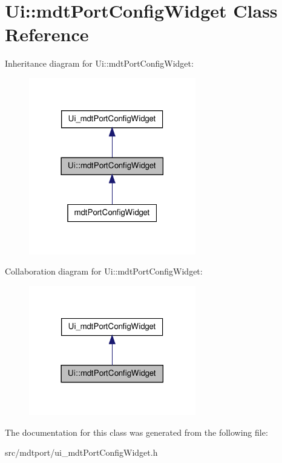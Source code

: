 \hypertarget{class_ui_1_1mdt_port_config_widget}{
\section{Ui::mdtPortConfigWidget Class Reference}
\label{class_ui_1_1mdt_port_config_widget}
}


Inheritance diagram for Ui::mdtPortConfigWidget:\nopagebreak
\begin{figure}[H]
\begin{center}
\leavevmode
\includegraphics[width=206pt]{class_ui_1_1mdt_port_config_widget__inherit__graph}
\end{center}
\end{figure}


Collaboration diagram for Ui::mdtPortConfigWidget:\nopagebreak
\begin{figure}[H]
\begin{center}
\leavevmode
\includegraphics[width=206pt]{class_ui_1_1mdt_port_config_widget__coll__graph}
\end{center}
\end{figure}


The documentation for this class was generated from the following file:\begin{DoxyCompactItemize}
\item 
src/mdtport/ui\_\-mdtPortConfigWidget.h\end{DoxyCompactItemize}
